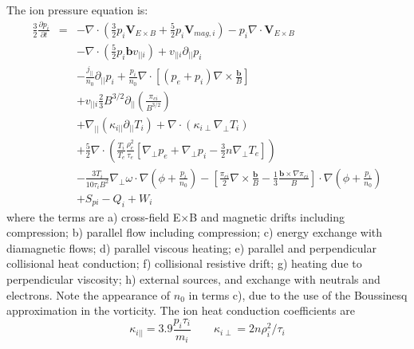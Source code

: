 \documentclass[12pt,a4paper]{article}
\begin{document}
The ion pressure equation is:
\begin{subequations}
\begin{eqnarray}
%
%
\frac{3}{2}\frac{\partial p_i}{\partial t} &=& -\nabla\cdot\left(\frac{3}{2}p_i\mathbf{V}_{E\times B} + \frac{5}{2}p_i\mathbf{V}_{mag,i}\right) - p_i\nabla\cdot\mathbf{V}_{E\times B} \\
&& -\nabla\cdot\left(\frac{5}{2}p_i\mathbf{b}v_{||i}\right) + v_{||i}\partial_{||}p_i \\
&& -\frac{j_{||}}{n_0}\partial_{||}p_i + \frac{p_i}{n_0}\nabla\cdot\left[\left(p_e + p_i\right)\nabla\times\frac{\mathbf{b}}{B}\right]  \\
&& + v_{||i}\frac{2}{3}B^{3/2}\partial_{||}\left(\frac{\pi_{ci}}{B^{3/2}}\right) \\
&& + \nabla_{||}\left(\kappa_{i||}\partial_{||}T_i\right) + \nabla\cdot\left(\kappa_{i\perp}\nabla_\perp T_i\right) \\
&& + \frac{5}{2}\nabla\cdot\left(\frac{T_i}{T_e}\frac{\rho_e^2}{\tau_e}\left[ \nabla_\perp p_e + \nabla_\perp p_i - \frac{3}{2}n\nabla_\perp T_e \right]\right) \\
&& - \frac{3T_i}{10\tau_iB^2}\nabla_\perp\omega\cdot\nabla\left(\phi + \frac{p_i}{n_0}\right) - \left[\frac{\pi_{ci}}{2}\nabla\times\frac{\mathbf{b}}{B} - \frac{1}{3}\frac{\mathbf{b}\times\nabla\pi_{ci}}{B}\right]\cdot\nabla\left(\phi + \frac{p_i}{n_0}\right) \\
&& + S_{pi} - Q_i + W_i
\end{eqnarray}
\end{subequations}
where the terms are a) cross-field E$\times$B and magnetic drifts including compression; b) parallel flow including compression;
c) energy exchange with diamagnetic flows; d) parallel viscous heating; e) parallel and perpendicular collisional heat conduction; f) collisional resistive drift; g) heating due to perpendicular viscosity; h)
external sources, and exchange with neutrals and electrons. Note the appearance of $n_0$ in terms c), due to the use of the Boussinesq approximation in the vorticity.
The ion heat conduction coefficients are
\begin{equation}
  \kappa_{i||} = 3.9\frac{p_i\tau_i}{m_i} \qquad \kappa_{i\perp} = 2n\rho_i^2/\tau_i
\end{equation}
\end{document}
